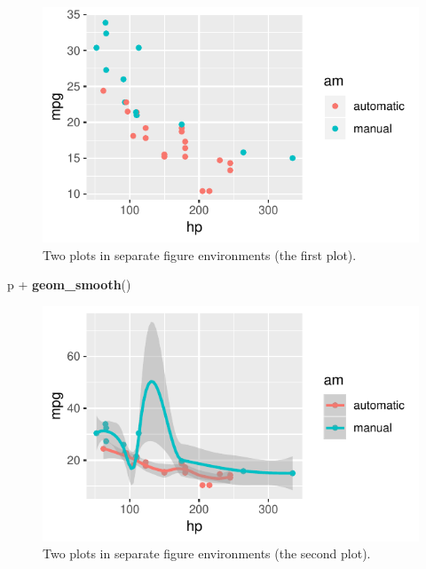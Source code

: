 \documentclass[]{tufte-handout}
\newenvironment{Shaded}{}{}
\newcommand{\KeywordTok}[1]{\textcolor[rgb]{0.00,0.44,0.13}{\textbf{#1}}}
\newcommand{\NormalTok}[1]{#1}
\newcommand{\OperatorTok}[1]{\textcolor[rgb]{0.40,0.40,0.40}{#1}}
\newcommand{\StringTok}[1]{\textcolor[rgb]{0.25,0.44,0.63}{#1}}
\begin{document}
\begin{figure}
\includegraphics{Epi_Notes_files/figure-latex/fig-two-separate-1} \caption[Two plots in separate figure environments (the first plot)]{Two plots in separate figure environments (the first plot).}\label{fig:fig-two-separate1}
\end{figure}

\begin{Shaded}
\begin{Highlighting}[]
\NormalTok{p }\OperatorTok{+}\StringTok{ }\KeywordTok{geom_smooth}\NormalTok{()}
\end{Highlighting}
\end{Shaded}

\begin{figure}
\includegraphics{Epi_Notes_files/figure-latex/fig-two-separate-2} \caption[Two plots in separate figure environments (the second plot)]{Two plots in separate figure environments (the second plot).}\label{fig:fig-two-separate2}
\end{figure}
\end{document}
